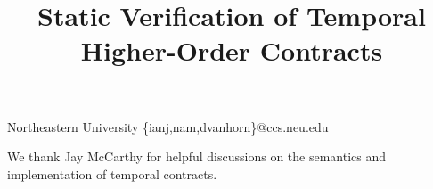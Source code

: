 \documentclass[preprint,onecolumn,9pt]{sigplanconf} %
\begin{document}
\copyrightdata{[to be supplied]}
\title{Static Verification of Temporal Higher-Order Contracts}

           {Northeastern University}
           {\{ianj,nam,dvanhorn\}@ccs.neu.edu}

\maketitle
\begin{abstract}

\end{abstract}



\acks We thank Jay McCarthy for helpful discussions on the semantics
and implementation of temporal contracts.

\balance

\end{document}
